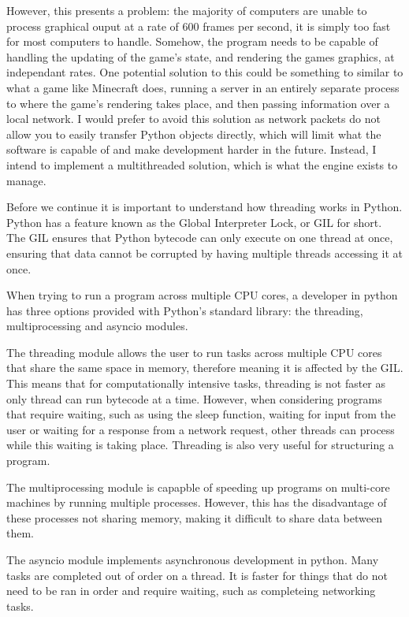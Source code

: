 \documentclass{report}
\begin{document}
However, this presents a problem: the majority of computers are unable to process graphical ouput at a rate of 600 frames per second, it is simply too fast for most computers to handle. Somehow, the program needs to be capable of handling the updating of the game's state, and rendering the games graphics, at independant rates. One potential solution to this could be something to similar to what a game like Minecraft does, running a server in an entirely separate process to where the game's rendering takes place, and then passing information over a local network. I would prefer to avoid this solution as network packets do not allow you to easily transfer Python objects directly, which will limit what the software is capable of and make development harder in the future. Instead, I intend to implement a multithreaded solution, which is what the engine exists to manage.

Before we continue it is important to understand how threading works in Python. Python has a feature known as the Global Interpreter Lock, or GIL for short. The GIL ensures that Python bytecode can only execute on one thread at once, ensuring that data cannot be corrupted by having multiple threads accessing it at once.

When trying to run a program across multiple CPU cores, a developer in python has three options provided with Python's standard library: the threading, multiprocessing and asyncio modules. 

The threading module allows the user to run tasks across multiple CPU cores that share the same space in memory, therefore meaning it is affected by the GIL. This means that for computationally intensive tasks, threading is not faster as only thread can run bytecode at a time. However, when considering programs that require waiting, such as using the sleep function, waiting for input from the user or waiting for a response from a network request, other threads can process while this waiting is taking place. Threading is also very useful for structuring a program.

The multiprocessing module is capapble of speeding up programs on multi-core machines by running multiple processes. However, this has the disadvantage of these processes not sharing memory, making it difficult to share data between them.

The asyncio module implements asynchronous development in python. Many tasks are completed out of order on a thread. It is faster for things that do not need to be ran in order and require waiting, such as completeing networking tasks.
\end{document}
